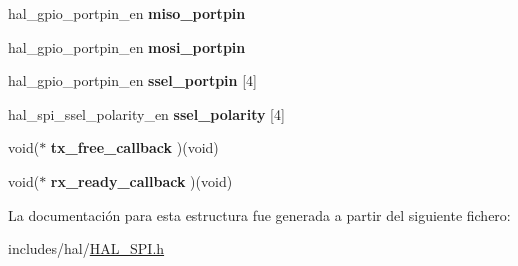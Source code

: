 \begin{DoxyCompactItemize}
hal\+\_\+gpio\+\_\+portpin\+\_\+en {\bfseries miso\+\_\+portpin}
\item 
\mbox{\label{structhal__spi__master__mode__config__t_a4fb47c8a6ad9526ebda336dd0f6791c4}} 
hal\+\_\+gpio\+\_\+portpin\+\_\+en {\bfseries mosi\+\_\+portpin}
\item 
\mbox{\label{structhal__spi__master__mode__config__t_a2f25d59ce0a44f5c3396a3d4e0af285e}} 
hal\+\_\+gpio\+\_\+portpin\+\_\+en {\bfseries ssel\+\_\+portpin} \mbox{[}4\mbox{]}
\item 
\mbox{\label{structhal__spi__master__mode__config__t_a1eefe5f46467025030c1122e6a734658}} 
hal\+\_\+spi\+\_\+ssel\+\_\+polarity\+\_\+en {\bfseries ssel\+\_\+polarity} \mbox{[}4\mbox{]}
\item 
\mbox{\label{structhal__spi__master__mode__config__t_a37ad5450ef4aaa67a00a2b97b1c43416}} 
void($\ast$ {\bfseries tx\+\_\+free\+\_\+callback} )(void)
\item 
\mbox{\label{structhal__spi__master__mode__config__t_a0adbbda899ec9ccbe80c88bfecf520ee}} 
void($\ast$ {\bfseries rx\+\_\+ready\+\_\+callback} )(void)
\end{DoxyCompactItemize}


La documentación para esta estructura fue generada a partir del siguiente fichero\+:\begin{DoxyCompactItemize}
\item 
includes/hal/\hyperlink{HAL__SPI_8h}{H\+A\+L\+\_\+\+S\+P\+I.\+h}\end{DoxyCompactItemize}
